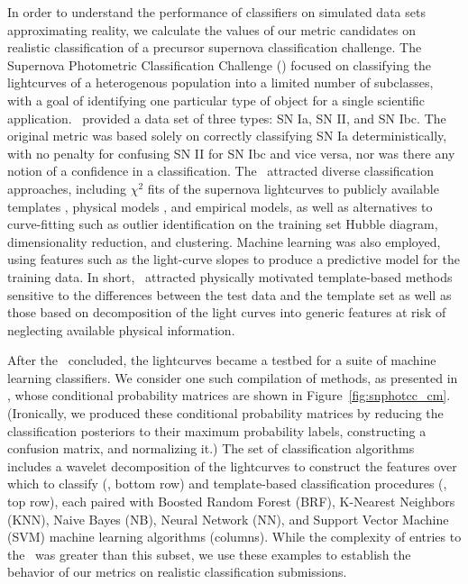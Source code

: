 In order to understand the performance of classifiers on simulated data sets approximating reality, we calculate the values of our metric candidates on realistic classification of a precursor supernova classification challenge.
The Supernova Photometric Classification Challenge (\snphotcc) \citep{kessler_supernova_2010} focused on classifying the lightcurves of a heterogenous population into a limited number of subclasses, with a goal of identifying one particular type of object for a single scientific application.
\snphotcc\ provided a data set of three types: SN Ia, SN II, and SN Ibc.
The original metric was based solely on correctly classifying SN Ia deterministically, with no penalty for confusing SN II for SN Ibc and vice versa, nor was there any notion of a confidence in a classification.
The \snphotcc\ attracted diverse classification approaches, including $\chi^{2}$ fits of the supernova lightcurves to publicly available templates \citep{nugent_kcorrections_2002}, physical models \citep{conley_sifto:_2008}, and empirical models, as well as alternatives to curve-fitting such as outlier identification on the training set Hubble diagram, dimensionality reduction, and clustering.
Machine learning was also employed, using features such as the light-curve slopes to produce a predictive model for the training data.
In short, \snphotcc\ attracted physically motivated template-based methods sensitive to the differences between the test data and the template set as well as those based on decomposition of the light curves into generic features at risk of neglecting available physical information.

After the \snphotcc\ concluded, the lightcurves became a testbed for a suite of machine learning classifiers.
We consider one such compilation of methods, as presented in \citet{lochner_photometric_2016}, whose conditional probability matrices are shown in Figure~\ref{fig:snphotcc_cm}.
(Ironically, we produced these conditional probability matrices by reducing the classification posteriors to their maximum probability labels, constructing a confusion matrix, and normalizing it.)
The set of classification algorithms includes a wavelet decomposition of the lightcurves to construct the features over which to classify (\citet{newling_statistical_2011}, bottom row) and template-based classification procedures (\citet{sako_photometric_2011}, top row), each paired with Boosted Random Forest (BRF), K-Nearest Neighbors (KNN), Naive Bayes (NB), Neural Network (NN), and Support Vector Machine (SVM) machine learning algorithms (columns).
While the complexity of entries to the \snphotcc\ was greater than this subset, we use these examples to establish the behavior of our metrics on realistic classification submissions.

